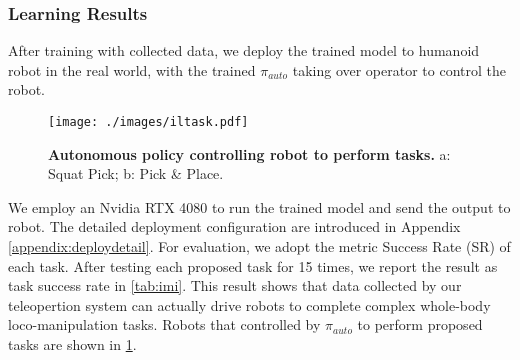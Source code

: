 \subsubsection{Learning Results}

After training with collected data, we deploy the trained model to humanoid robot in the real world, with the trained $\pi_{auto}$ taking over operator to control the robot.
\begin{figure}[!ht]
  \centering
  \texttt{[image: ./images/iltask.pdf]}
  \caption{\textbf{Autonomous policy controlling robot to perform tasks.} \textcolor{mycolor}{a:} Squat Pick; \textcolor{mycolor}{b:} Pick \& Place.}
  \label{fig:imitask}
\end{figure}
We employ an Nvidia RTX 4080 to run the trained model and send the output to robot. The detailed deployment configuration are introduced in Appendix \ref{appendix:deploydetail}. For evaluation, we adopt the metric Success Rate (SR) of each task. After testing each proposed task for 15 times, we report the result as task success rate in \cref{tab:imi}. This result shows that data collected by our teleopertion system can actually drive robots to complete complex whole-body loco-manipulation tasks. Robots that controlled by $\pi_{auto}$ to perform proposed tasks are shown in \cref{fig:imitask}.

